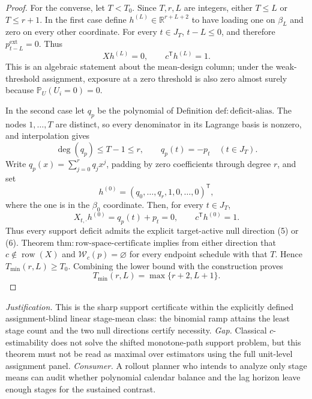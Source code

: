 \documentclass{article}
\begin{document}
\begin{proof}
For the converse, let \(T<T_0\).  Since \(T,r,L\) are integers, either \(T\le L\) or \(T\le r+1\).  In the first case define \(h^{(L)}\in\mathbb R^{r+L+2}\) to have loading one on \(\beta_L\) and zero on every other coordinate.  For every \(t\in J_T\), \(t-L\le0\), and therefore \(p_{t-L}^{\mathrm{ext}}=0\).  Thus
\[
 Xh^{(L)}=0,
 \qquad c^{\mathsf T}h^{(L)}=1.
 \tag{5}
\]
This is an algebraic statement about the mean-design column; under the weak-threshold assignment, exposure at a zero threshold is also zero almost surely because \(\mathbb P_U(U_i=0)=0\).

In the second case let \(q_p\) be the polynomial of Definition \(\mathrm{def:deficit\text{-}alias}\).  The nodes \(1,\ldots,T\) are distinct, so every denominator in its Lagrange basis is nonzero, and interpolation gives
\[
 \deg(q_p)\le T-1\le r,
 \qquad q_p(t)=-p_t\quad(t\in J_T).
\]
Write \(q_p(x)=\sum_{j=0}^{r}q_jx^j\), padding by zero coefficients through degree \(r\), and set
\[
 h^{(0)}=(q_0,\ldots,q_r,1,0,\ldots,0)^{\mathsf T},
\]
where the one is in the \(\beta_0\) coordinate.  Then, for every \(t\in J_T\),
\[
 X_{t,\cdot}h^{(0)}=q_p(t)+p_t=0,
 \qquad c^{\mathsf T}h^{(0)}=1.
 \tag{6}
\]
Thus every support deficit admits the explicit target-active null direction (5) or (6).  Theorem \(\mathrm{thm:row\text{-}space\text{-}certificate}\) implies from either direction that \(c\notin\operatorname{row}(X)\) and \(\mathcal W_c(p)=\varnothing\) for every endpoint schedule with that \(T\).  Hence \(T_{\min}(r,L)\ge T_0\).  Combining the lower bound with the construction proves
\[
 T_{\min}(r,L)=\max\{r+2,L+1\}.
\]
\end{proof}
\par\smallskip\noindent \textit{Justification.} This is the sharp support certificate within the explicitly defined assignment-blind linear stage-mean class: the binomial ramp attains the least stage count and the two null directions certify necessity. \textit{Gap.} Classical \(c\)-estimability does not solve the shifted monotone-path support problem, but this theorem must not be read as maximal over estimators using the full unit-level assignment panel. \textit{Consumer.} A rollout planner who intends to analyze only stage means can audit whether polynomial calendar balance and the lag horizon leave enough stages for the sustained contrast.
\end{document}
